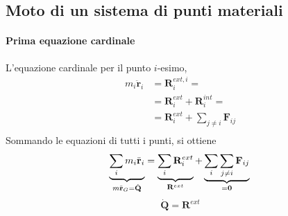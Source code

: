 \subsection{Moto di un sistema di punti materiali}
\paragraph{Prima equazione cardinale}
L'equazione cardinale per il punto $i$-esimo,
\begin{equation}
\begin{aligned}
    m_i \ddot{\mathbf{r}}_i & = \mathbf{R}^{ext,i}_i = \\
    & = \mathbf{R}^{ext}_i + \mathbf{R}^{int}_i = \\
    & = \mathbf{R}^{ext}_i + \sum_{j \ne i} \mathbf{F}_{ij} \\
\end{aligned}
\end{equation}
Sommando le equazioni di tutti i punti, si ottiene
\begin{equation}
    \underbrace{\sum_{i} m_i \ddot{\mathbf{r}}_i}_{m \ddot{\mathbf{r}}_G = \dot{\mathbf{Q}} } = \underbrace{\sum_{i} \mathbf{R}^{ext}_i}_{\mathbf{R}^{ext}} + \underbrace{\sum_{i} \sum_{j \ne i} \mathbf{F}_{ij}}_{=\mathbf{0}} \\
\end{equation}
\begin{equation}
    \dot{\mathbf{Q}} = \mathbf{R}^{ext} 
\end{equation}

